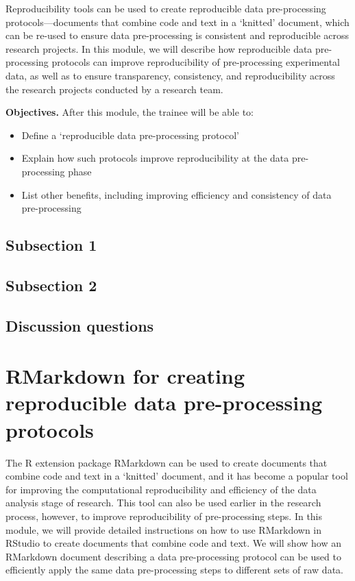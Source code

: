 \documentclass[]{tufte-book}
\providecommand{\tightlist}{%
  \setlength{\itemsep}{0pt}\setlength{\parskip}{0pt}}
\begin{document}
Reproducibility tools can be used to create reproducible data pre-processing
protocols---documents that combine code and text in a `knitted' document, which
can be re-used to ensure data pre-processing is consistent and reproducible
across research projects. In this module, we will describe how reproducible data
pre-processing protocols can improve reproducibility of pre-processing
experimental data, as well as to ensure transparency, consistency, and
reproducibility across the research projects conducted by a research team.

\textbf{Objectives.} After this module, the trainee will be able to:

\begin{itemize}
\tightlist
\item
  Define a `reproducible data pre-processing protocol'
\item
  Explain how such protocols improve reproducibility at the data pre-processing
  phase
\item
  List other benefits, including improving efficiency and consistency of data
  pre-processing
\end{itemize}

\hypertarget{subsection-1-13}{%
\subsection{Subsection 1}\label{subsection-1-13}}

\hypertarget{subsection-2-12}{%
\subsection{Subsection 2}\label{subsection-2-12}}

\hypertarget{discussion-questions-6}{%
\subsection{Discussion questions}\label{discussion-questions-6}}

\hypertarget{rmarkdown-for-creating-reproducible-data-pre-processing-protocols}{%
\section{RMarkdown for creating reproducible data pre-processing protocols}\label{rmarkdown-for-creating-reproducible-data-pre-processing-protocols}}

The R extension package RMarkdown can be used to create documents that combine
code and text in a `knitted' document, and it has become a popular tool for
improving the computational reproducibility and efficiency of the data analysis
stage of research. This tool can also be used earlier in the research process,
however, to improve reproducibility of pre-processing steps. In this module, we
will provide detailed instructions on how to use RMarkdown in RStudio to create
documents that combine code and text. We will show how an RMarkdown document
describing a data pre-processing protocol can be used to efficiently apply the
same data pre-processing steps to different sets of raw data.
\end{document}
